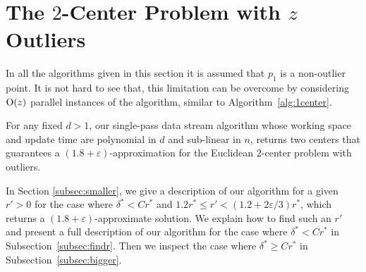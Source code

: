\documentclass[envcountsame]{cls/cccg15}
\newcommand{\cO}{\ensuremath{{\rm O}}}
\newcommand{\lee}{\leqslant}
\newcommand{\gee}{\geqslant}
\renewcommand{\le}{\lee}
\renewcommand{\ge}{\gee}
\newcommand{\eps}{\varepsilon}
\begin{document}



\section{The $2$-Center Problem with $z$ Outliers}


In all the algorithms given in this section it is assumed that $p_1$ is a non-outlier point. It is not hard to see that, this limitation can be overcome by considering $\cO(z)$ parallel instances of the algorithm, similar to Algorithm~\ref{alg:1center}.

\begin{theorem}
For any fixed $d > 1$, our single-pass data stream algorithm whose working space and update time are polynomial in $d$ and sub-linear in $n$, returns two centers that guarantees a $(1.8 + \eps)$-approximation for the Euclidean $2$-center problem with outliers.
\end{theorem}



In Section \ref{subsec:smaller}, we give a description of our algorithm for a given $r' > 0$ for the case where $\delta^* < C r^*$ and $1.2r^* \le r' < (1.2 + 2\eps/3)r^*$, which returns a $(1.8 + \eps)$-approximate solution. We explain how to find such an $r'$ and present a full description of our algorithm for the case where $\delta^* < C r^*$ in Subsection~\ref{subsec:findr}. Then we inspect the case where $\delta^* \ge C r^*$ in Subsection~\ref{subsec:bigger}.
\end{document}
